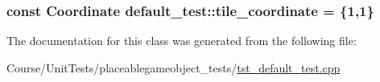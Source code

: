 \hypertarget{classdefault__test_a78f2cc4bd3f0490e6b169d0e3864a0c4}{
\subsubsection[{tile\-\_\-coordinate}]{\setlength{\rightskip}{0pt plus 5cm}const {\bf Coordinate} default\-\_\-test\-::tile\-\_\-coordinate = \{1,1\}\hspace{0.3cm}{\ttfamily [private]}}}\label{classdefault__test_a78f2cc4bd3f0490e6b169d0e3864a0c4}


The documentation for this class was generated from the following file\-:\begin{DoxyCompactItemize}
\item 
Course/\-Unit\-Tests/placeablegameobject\-\_\-tests/\hyperlink{tst__default__test_8cpp}{tst\-\_\-default\-\_\-test.\-cpp}\end{DoxyCompactItemize}
